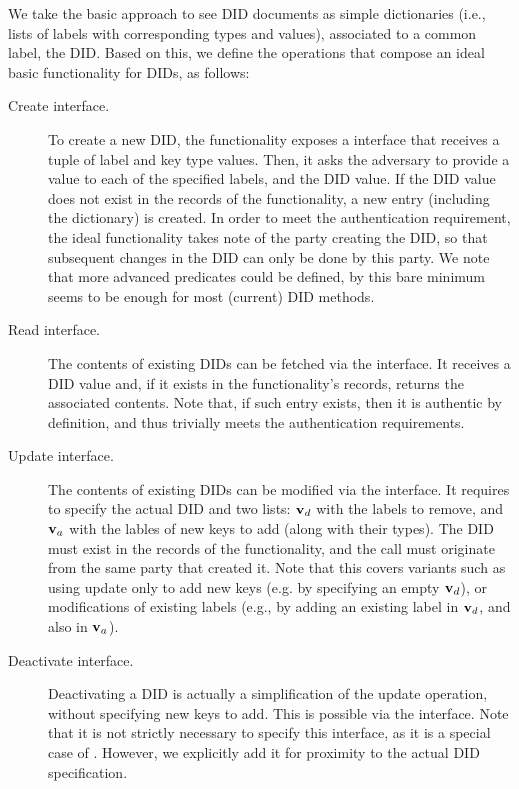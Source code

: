 \iffalse
We take the basic approach to see DID documents as simple dictionaries
(i.e., lists of labels with corresponding types and values), associated to a
common label, the DID. Based on this, we define the operations that compose an
ideal basic functionality for DIDs, as follows:

\begin{description}
\item[Create interface.] To create a new DID, the functionality exposes a
   interface that receives a tuple of label and key type values.
  Then, it asks the adversary to provide a value to each of the specified
  labels, and the DID value. If the DID value does not exist in the records of
  the functionality, a new entry (including the dictionary) is created. In order
  to meet the authentication requirement, the ideal functionality takes note of
  the party creating the DID, so that subsequent changes in the DID can only be
  done by this party. We note that more advanced predicates could be defined, by
  this bare minimum seems to be enough for most (current) DID methods.
\item[Read interface.] The contents of existing DIDs can be fetched via the
   interface. It receives a DID value and, if it exists in the
  functionality's records, returns the associated contents. Note that, if such
  entry exists, then it is authentic by definition, and thus trivially meets
  the authentication requirements.
\item[Update interface.] The contents of existing DIDs can be modified via the
   interface. It requires to specify the actual DID and two lists:
  $\mathbf{v}_d$ with the labels to remove, and $\mathbf{v}_a$ with the lables of new keys
  to add (along with their types). The DID must exist in the records of the
  functionality, and the call must originate from the same party that created
  it. Note that this covers variants such as using update only to add new keys
  (e.g. by specifying an empty $\mathbf{v}_d$), or modifications of existing labels
  (e.g., by adding an existing label in $\mathbf{v}_d$, and also in $\mathbf{v}_a$).
\item[Deactivate interface.] Deactivating a DID is actually a simplification of
  the update operation, without specifying new keys to add. This is possible
  via the  interface. Note that it is not strictly necessary to
  specify this interface, as it is a special case of . However, we
  explicitly add it for proximity to the actual DID specification. 
\end{description}

